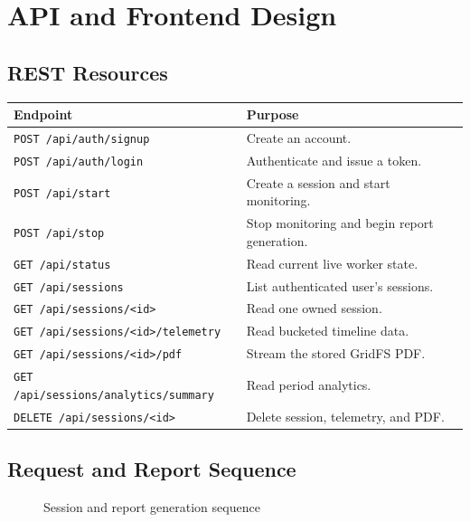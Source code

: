 \documentclass[12pt,a4paper]{report}
\newcommand{\code}[1]{\texttt{#1}}
\begin{document}
\chapter{API and Frontend Design}
\section{REST Resources}
\begin{longtable}{p{}p{}}
\toprule
\textbf{Endpoint} & \textbf{Purpose}\\
\midrule
\code{POST /api/auth/signup} & Create an account.\\
\code{POST /api/auth/login} & Authenticate and issue a token.\\
\code{POST /api/start} & Create a session and start monitoring.\\
\code{POST /api/stop} & Stop monitoring and begin report generation.\\
\code{GET /api/status} & Read current live worker state.\\
\code{GET /api/sessions} & List authenticated user's sessions.\\
\code{GET /api/sessions/<id>} & Read one owned session.\\
\code{GET /api/sessions/<id>/telemetry} & Read bucketed timeline data.\\
\code{GET /api/sessions/<id>/pdf} & Stream the stored GridFS PDF.\\
\code{GET /api/sessions/analytics/summary} & Read period analytics.\\
\code{DELETE /api/sessions/<id>} & Delete session, telemetry, and PDF.\\
\bottomrule
\end{longtable}

\section{Request and Report Sequence}
\begin{figure}[H]
\centering
{}
\caption{Session and report generation sequence}
\end{figure}
\end{document}

